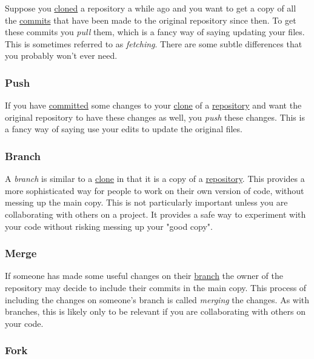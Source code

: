 \documentclass[11pt,onecolumn]{scrartcl}
\begin{document}
Suppose you \hyperref[sec:org434e06c]{cloned} a repository a while ago and you want to get a copy of all
the \hyperref[sec:orgf8649b1]{commits} that have been made to the original repository since then. To get
these commits you \emph{pull} them, which is a fancy way of saying updating your
files. This is sometimes referred to as \emph{fetching}. There are some subtle
differences that you probably won't ever need.

\subsubsection*{Push}
\label{sec:org80ed38b}

If you have \hyperref[sec:orgf8649b1]{committed} some changes to your \hyperref[sec:org434e06c]{clone} of a \hyperref[sec:org9185b51]{repository} and want the
original repository to have these changes as well, you \emph{push} these changes.
This is a fancy way of saying use your edits to update the original files.

\subsubsection*{Branch}
\label{sec:orgb816f44}

A \emph{branch} is similar to a \hyperref[sec:org434e06c]{clone} in that it is a copy of a \hyperref[sec:org9185b51]{repository}. This
provides a more sophisticated way for people to work on their own version of
code, without messing up the main copy. This is not particularly important
unless you are collaborating with others on a project. It provides a safe way to
experiment with your code without risking messing up your "good copy".

\subsubsection*{Merge}
\label{sec:orgce0d2b8}

If someone has made some useful changes on their \hyperref[sec:orgb816f44]{branch} the owner of the
repository may decide to include their commits in the main copy. This process of
including the changes on someone's branch is called \emph{merging} the changes. As
with branches, this is likely only to be relevant if you are collaborating with
others on your code.

\subsubsection*{Fork}
\label{sec:orgef97574}
\end{document}
